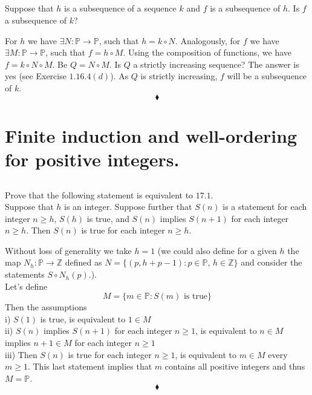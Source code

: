 \subsection{}
\begin{tcolorbox}
Suppose that $h$ is a subsequence of a sequence $k$ and $f$ is a subsequence of $h$. Is $f$ a subsequence of $k$? 
\end{tcolorbox}
$$ $$
For  $h$ we have $\exists N:\mathbb{P}\rightarrow \mathbb{P} $, such that $h=k\circ N$. Analogously, for  $f$ we have $\exists M:\mathbb{P}\rightarrow \mathbb{P} $, such that $f=h\circ M$. Using the composition of functions, we have $f=k\circ N\circ M$. Be $Q= N\circ M$. Is $Q$ a strictly increasing sequence? The  answer is yes (see Exercise $1.16.4(d)$).
As $Q$ is strictly increasing, $f$ will be a subsequence of $k$.
$$\blacklozenge$$

\newpage

 \section{Finite induction and well-ordering for positive integers.}
\subsection{}
\begin{tcolorbox}
Prove that the following statement is equivalent to $17.1$.\\
Suppose that $h$ is an integer. Suppose further that $S(n)$ is 
a statement for each integer $n\ge h$, $S(h)$ is true, and $S(n)$ implies $S(n + 1)$ for each integer $n\ge h$. Then $S(n)$ is true for each integer $n \ge h$. 
\end{tcolorbox}
$$ $$
Without loss of generality we take $h=1$ (we could also define for a given $h$ the map $N_h:\mathbb{P}\rightarrow \mathbb{Z}$ defined as $N=\{(p,h+p-1): p\in \mathbb{P},\, h\in \mathbb{Z}\}$ and consider the statements $S\circ N_h(p)$.).\\
Let's define $$M=\{ m\in \mathbb{P}: S(m)\text{ is true}\}$$
Then the assumptions\\
i) $S(1)$ is true, is equivalent to $1\in M$\\ 
ii) $S(n)$ implies $S(n + 1)$ for each integer $n\ge 1$, is equivalent to $n\in M$ implies $ n+ 1\in M $ for each integer $n\ge 1$\\ 
iii) Then $S(n)$ is true for each integer $n \ge 1$, is equivalent to $m\in M$ every $m\ge 1$. This last statement implies that $m$ contains all positive integers and thus $M = \mathbb{P}$.
$$\blacklozenge$$


